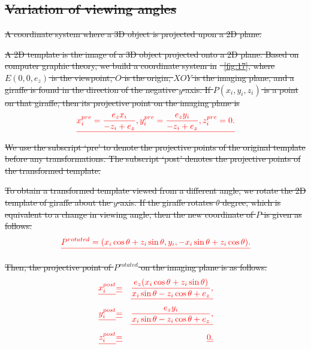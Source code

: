 \documentclass[journal]{IEEEtran}
\providecommand{\DIFdel}[1]{{\protect\color{red}\sout{#1}}}                      %
\providecommand{\DIFdelFL}[1]{\DIFdel{#1}} %
\begin{document}
\subsection{\DIFdel{Variation of viewing angles}}
\addtocounter{subsection}{-1}%

{%
\DIFdelFL{A coordinate system where a 3D object is projected upon a 2D plane.}}

\DIFdel{A 2D template is the image of a 3D object projected onto a 2D plane. 
Based on computer graphic theory, we build a coordinate system in }%
\DIFdel{~\ref{fig:17}, 
where $E(0,0,e_z)$ is the viewpoint, $O$ is the origin, $XOY$ is the imaging plane, 
and a giraffe is found in the direction of the negative $y$-axis.
If $P(x_i,y_i,z_i)$ is a point on that giraffe, 
then its projective point on the imaging plane is
}\begin{displaymath}
\DIFdel{x_i^{pre}=\frac{e_z x_i}{-z_i+e_z}, y_i^{pre}=\frac{e_z y_i}{-z_i+e_z}, z_i^{pre}=0.
\label{eqn:2}
}\end{displaymath}
\DIFdel{We use the subscript `pre' to denote the projective points of the original template before any transformations.
The subscript `post' denotes the projective points of the transformed template.
}%

\DIFdel{To obtain a transformed template viewed from a different angle,
we rotate the 2D template of giraffe about the $y$-axis.
If the giraffe rotates $\theta$ degree, which is equivalent to a change in viewing angle, 
then the new coordinate of $P$ is given as follows. 
}\begin{displaymath}
\DIFdel{P^{rotated}=(x_i \cos\theta+z_i \sin\theta,y_i,-x_i \sin\theta+z_i \cos\theta). 
}\end{displaymath}

\DIFdel{Then, the projective point of $P^{rotated}$ on the imaging plane is as follows.
}\begin{align*}
\DIFdel{x_i^{post}}&\DIFdel{=}&\DIFdel{\frac{e_z(x_i \cos\theta+z_i \sin\theta)}{x_i \sin\theta-z_i \cos\theta+e_z}, \nonumber}\\
\DIFdel{y_i^{post}}&\DIFdel{=}&\DIFdel{\frac{e_z y_i}{x_i \sin\theta-z_i \cos\theta+e_z}, \nonumber}\\
\DIFdel{z_i^{post}}&\DIFdel{=}&\DIFdel{0.
\label{eqn:4}
}\end{align*}
\end{document}
